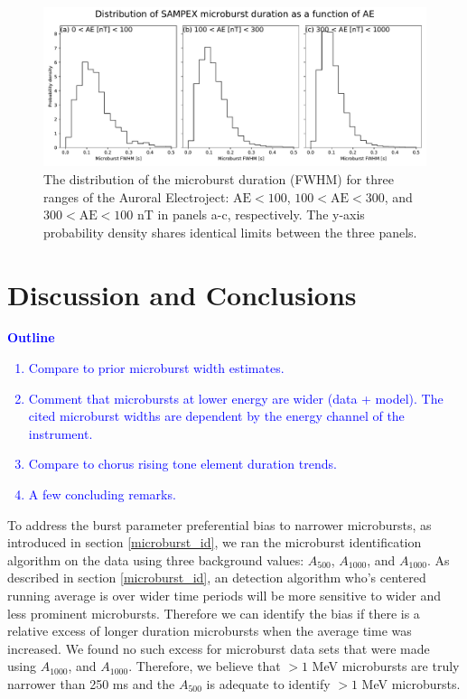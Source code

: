 \documentclass[draft]{agujournal2019}
\begin{document}
\begin{figure}
\noindent\includegraphics[width=\textwidth]{figures/fig4.pdf}
\caption{The distribution of the microburst duration (FWHM) for three ranges of the Auroral Electroject: $\mathrm{AE} < 100$, $100 < \mathrm{AE} < 300$, and $300 < \mathrm{AE} < 100$ nT in panels a-c, respectively. The y-axis probability density shares identical limits between the three panels.}
\label{fig3}
\end{figure}

\section{Discussion and Conclusions}\label{discussion}
\textcolor{blue}{
\textbf{Outline}
\begin{enumerate}
    \item Compare to prior microburst width estimates.
    \item Comment that microbursts at lower energy are wider (data + model). The cited microburst widths are dependent by the energy channel of the instrument. 
    \item Compare to chorus rising tone element duration trends.
    \item A few concluding remarks.
\end{enumerate}
}

To address the burst parameter preferential bias to narrower microbursts, as introduced in section \ref{microburst_id}, we ran the microburst identification algorithm on the data using three background values: $A_{500}$, $A_{1000}$, and $A_{1000}$. As described in section \ref{microburst_id}, an detection algorithm who's centered running average is over wider time periods will be more sensitive to wider and less prominent microbursts. Therefore we can identify the bias if there is a relative excess of longer duration microbursts when the average time was increased. We found no such excess for microburst data sets that were made using $A_{1000}$, and $A_{1000}$. Therefore, we believe that $>1$ MeV microbursts are truly narrower than 250 ms and the $A_{500}$ is adequate to identify $>1$ MeV microbursts.
\end{document}
